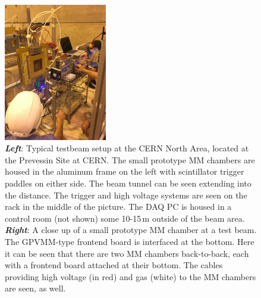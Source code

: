 \begin{figure}[!htb]
    \begin{center}
        \includegraphics[width=0.4\textwidth]{figures/nsw/use_cases/verso_testbeam2}
        \caption{
            \textbf{\textit{Left}}: Typical testbeam setup at the CERN North Area, located at the Prevessin Site at CERN.
                The small prototype MM chambers are housed in the aluminum frame on the left with scintillator
                trigger paddles on either side.
                The beam tunnel can be seen extending into the distance.
                The trigger and high voltage systems are seen on the rack in the middle of the picture.
                The DAQ PC is housed in a control room (not shown) some 10-15\,m outside of the beam area.
            \textbf{\textit{Right}}: A close up of a small prototype MM chamber at a test beam. The
                GPVMM-type frontend board is interfaced at the bottom. Here it can be seen that there
                are two MM chambers back-to-back, each with a frontend board attached at their bottom.
                The cables providing high voltage (in red) and gas (white) to the MM chambers are seen, as well.
        }
        \label{fig:vrs_testbeam}
    \end{center}
\end{figure}

